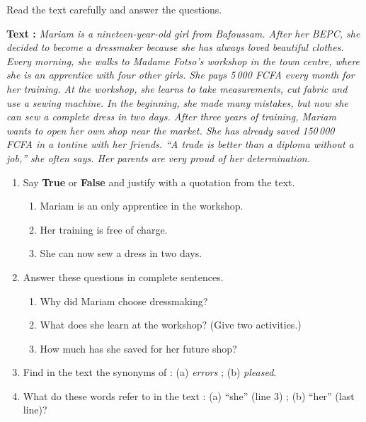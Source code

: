 \documentclass[11pt]{article}
\begin{document}
\begin{exercice}
Read the text carefully and answer the questions.

\textbf{Text :} \emph{Mariam is a nineteen-year-old girl from Bafoussam. After her BEPC, she decided to become a dressmaker because she has always loved beautiful clothes. Every morning, she walks to Madame Fotso's workshop in the town centre, where she is an apprentice with four other girls. She pays 5\,000 FCFA every month for her training. At the workshop, she learns to take measurements, cut fabric and use a sewing machine. In the beginning, she made many mistakes, but now she can sew a complete dress in two days. After three years of training, Mariam wants to open her own shop near the market. She has already saved 150\,000 FCFA in a tontine with her friends. ``A trade is better than a diploma without a job,'' she often says. Her parents are very proud of her determination.}

\begin{enumerate}
\item Say \textbf{True} or \textbf{False} and justify with a quotation from the text.
\begin{enumerate}
\item[a.] Mariam is an only apprentice in the workshop.
\item[b.] Her training is free of charge.
\item[c.] She can now sew a dress in two days.
\end{enumerate}
\item Answer these questions in complete sentences.
\begin{enumerate}
\item[a.] Why did Mariam choose dressmaking?
\item[b.] What does she learn at the workshop? (Give two activities.)
\item[c.] How much has she saved for her future shop?
\end{enumerate}
\item Find in the text the synonyms of : (a) \emph{errors} ; (b) \emph{pleased}.
\item What do these words refer to in the text : (a) ``she'' (line 3) ; (b) ``her'' (last line)?
\end{enumerate}
\end{exercice}
\end{document}
